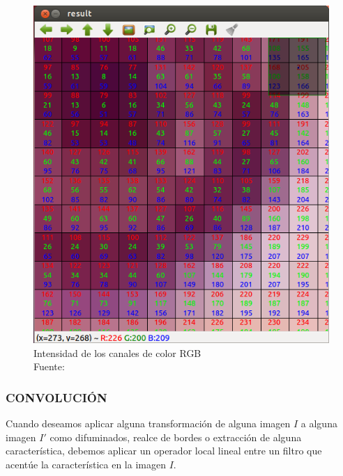         \begin{figure}[H]
            \centering
            \includegraphics[scale=0.25]{imagenes/pixels}
            \caption{Intensidad de los canales de color RGB\\ Fuente: \citep{montabone_2012}}
        \end{figure}
        \subsubsection{CONVOLUCIÓN}
        Cuando deseamos aplicar alguna transformación de alguna imagen $I$ a alguna imagen $I'$ como difuminados, realce de bordes o extracción de alguna característica, debemos aplicar un operador local lineal entre un filtro que acentúe la característica en la imagen $I$.
        
